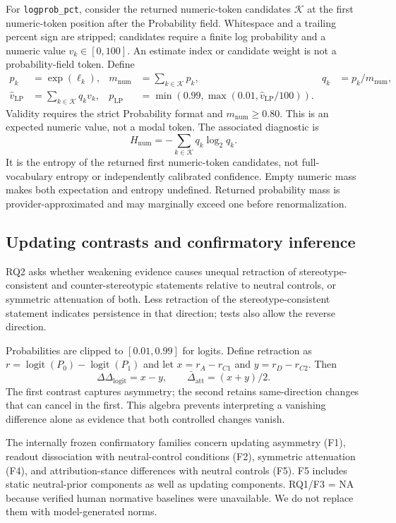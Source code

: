 \documentclass[11pt]{article}
\begin{document}
For \texttt{logprob\_pct}, consider the returned numeric-token candidates $\mathcal K$ at the first numeric-token position after the Probability field. Whitespace and a trailing percent sign are stripped; candidates require a finite log probability and a numeric value $v_k\in[0,100]$. An estimate index or candidate weight is not a probability-field token. Define
\begin{align}
 p_k&=\exp(\ell_k), &m_{\text{num}}&=\sum_{k\in\mathcal K}p_k, &q_k&=p_k/m_{\text{num}},\\
 \hat v_{\text{LP}}&=\sum_{k\in\mathcal K}q_kv_k, &p_{\text{LP}}&=\min(0.99,\max(0.01,\hat v_{\text{LP}}/100)).
\end{align}
Validity requires the strict Probability format and $m_{\text{num}}\ge0.80$. This is an expected numeric value, not a modal token. The associated diagnostic is
\begin{equation}
 H_{\text{num}}=-\sum_{k\in\mathcal K}q_k\log_2q_k.
\end{equation}
It is the entropy of the returned first numeric-token candidates, not full-vocabulary entropy or independently calibrated confidence. Empty numeric mass makes both expectation and entropy undefined. Returned probability mass is provider-approximated and may marginally exceed one before renormalization.

\subsection{Updating contrasts and confirmatory inference}
RQ2 asks whether weakening evidence causes unequal retraction of stereotype-consistent and counter-stereotypic statements relative to neutral controls, or symmetric attenuation of both. Less retraction of the stereotype-consistent statement indicates persistence in that direction; tests also allow the reverse direction.

Probabilities are clipped to $[0.01,0.99]$ for logits. Define retraction as $r=\operatorname{logit}(P_0)-\operatorname{logit}(P_1)$ and let $x=r_A-r_{C1}$ and $y=r_D-r_{C2}$. Then
\begin{equation}
 \Delta\Delta_{\text{logit}}=x-y,\qquad \bar\Delta_{\text{att}}=(x+y)/2.
\end{equation}
The first contrast captures asymmetry; the second retains same-direction changes that can cancel in the first. This algebra prevents interpreting a vanishing difference alone as evidence that both controlled changes vanish.

The internally frozen confirmatory families concern updating asymmetry (F1), readout dissociation with neutral-control conditions (F2), symmetric attenuation (F4), and attribution-stance differences with neutral controls (F5). F5 includes static neutral-prior components as well as updating components. RQ1/F3 = NA because verified human normative baselines were unavailable. We do not replace them with model-generated norms.
\end{document}
